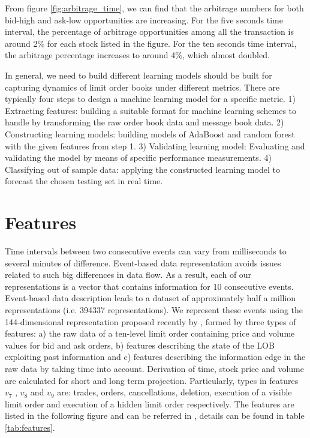 From figure \ref{fig:arbitrage_time},   we can find that the arbitrage numbers for both bid-high and ask-low opportunities are increasing. For the five seconds time interval,   the percentage of arbitrage opportunities among all the transaction is around 2\% for each stock listed in the figure. For the ten seconds time interval,   the arbitrage percentage increases to around 4\%,   which almost doubled. 

In general,  we need to build different learning models should be built for capturing dynamics of limit order books under different metrics. There are typically four steps to design a machine learning model for a specific
metric.
1) Extracting features: building a suitable format for machine learning schemes to handle by transforming the raw order book data  and message book data.
2) Constructing learning models: building models of AdaBoost and random forest with the given features from step 1. 
3) Validating learning model: Evaluating and validating the model by means of specific performance measurements.
4) Classifying out of sample data: applying the  constructed learning model to forecast the chosen testing set in real time.

\section{Features}
Time intervals between two consecutive events can vary from
milliseconds to several minutes of difference. Event-based data representation
avoids issues related to such big differences in data flow. As a result,   each of
our representations is a vector that contains information for 10 consecutive
events. Event-based data description leads to a dataset of approximately
half a million representations (i.e. 394337 representations). We represent
these events using the 144-dimensional representation proposed recently by
\cite{kercheval2015modelling}  ,   formed by three types of features: a) the raw
data of a ten-level limit order containing price and volume values for bid
and ask orders,   b) features describing the state of the LOB exploiting past
information and c) features describing the information edge in the raw data
by taking time into account. Derivation of time,   stock price and volume are
calculated for short and long term projection. Particularly,   types in features
$v_7$ ,   $v_8$ and $v_9$ are: trades,   orders,   cancellations,   deletion,   execution of a visible
limit order and execution of a hidden limit order respectively. The features are listed in the following figure and can be referred in \cite{kercheval2015modelling},   details can be found in table \ref{tab:features}. 

